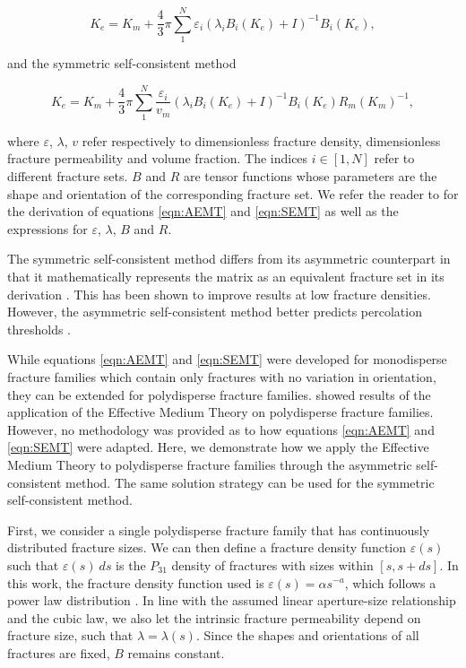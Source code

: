 \documentclass[draft]{agujournal2018}
\begin{document}
\begin{equation}
K_e=K_m+ \frac{4}{3} \pi \sum_{1}^{N} \varepsilon_i(\lambda_i B_i (K_e)+I)^{-1}B_i(K_e),
\label{eqn:AEMT}
\end{equation}

and the symmetric self-consistent method

\begin{equation}
K_e=K_m+ \frac{4}{3} \pi \sum_{1}^{N} \frac{\varepsilon_i}{v_m}(\lambda_i B_i (K_e)+I)^{-1}B_i(K_e)R_m(K_m)^{-1},
\label{eqn:SEMT}
\end{equation}

where $\varepsilon$, $\lambda$, $v$ refer respectively to dimensionless fracture density, dimensionless fracture permeability and volume fraction. The indices $i\in[1,N]$ refer to different fracture sets. $B$ and $R$ are tensor functions whose parameters are the shape and orientation of the corresponding fracture set. We refer the reader to \citet{Saevik2013} for the derivation of equations \ref{eqn:AEMT} and \ref{eqn:SEMT} as well as the expressions for $\varepsilon$, $\lambda$, $B$ and $R$.

The symmetric self-consistent method differs from its asymmetric counterpart in that it mathematically represents the matrix as an equivalent fracture set in its derivation \citep{Barthelemy2009, Saevik2013}. This has been shown to improve results at low fracture densities. However, the asymmetric self-consistent method better predicts percolation thresholds \citep{Saevik2013, Saevik2014}.

While equations \ref{eqn:AEMT} and \ref{eqn:SEMT} were developed for monodisperse fracture families which contain only fractures with no variation in orientation, they can be extended for polydisperse fracture families. \citet{Ebigbo2016} showed results of the application of the Effective Medium Theory on polydisperse fracture families. However, no methodology was provided as to how equations \ref{eqn:AEMT} and \ref{eqn:SEMT} were adapted. Here, we demonstrate how we apply the Effective Medium Theory to polydisperse fracture families through the asymmetric self-consistent method. The same solution strategy can be used for the symmetric self-consistent method. 

First, we consider a single polydisperse fracture family that has continuously distributed fracture sizes. We can then define a fracture density function $\varepsilon(s)$ such that $\varepsilon(s)\ ds$ is the $P_{31}$ density of fractures with sizes within $[s,s+ds]$. In this work, the fracture density function used is $\varepsilon (s)=\alpha s^{-a}$, which follows a power law distribution \citep{Bonnet2001}. In line with the assumed linear aperture-size relationship and the cubic law, we also let the intrinsic fracture permeability depend on fracture size, such that $\lambda=\lambda (s)$. Since the shapes and orientations of all fractures are fixed, $B$ remains constant.
\end{document}
